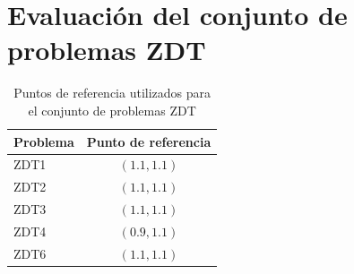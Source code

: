 \section{Evaluaci\'on del conjunto de problemas ZDT}

\begin{table}
  \begin{center}
    \begin{tabular}{|l||c|}
	\hline
	Problema  & Punto de referencia \\ 
	\hline
	\hline
	ZDT1 & $(1.1,1.1)$ \\ 
	\hline
	ZDT2 &  $(1.1,1.1)$\\
	\hline
	ZDT3 &  $(1.1,1.1)$\\
	\hline
	ZDT4 &  $(0.9,1.1)$\\
	\hline
	ZDT6 &  $(1.1,1.1)$\\
	\hline
  \end{tabular}
  \caption{Puntos de referencia utilizados para el conjunto de problemas ZDT}
  \label{tab:ref}
\end{center}
\end{table}

